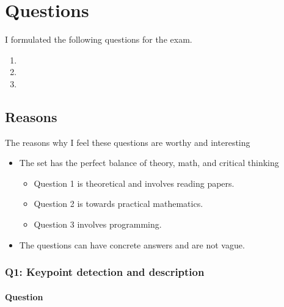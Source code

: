 
\section{Questions}

I formulated the following questions for the exam.

\newcommand{\questionOne}{
    
}

\newcommand{\questionTwo}{
    
}

\newcommand{\questionThree}{
    
}


\begin{enumerate}
    \item \questionOne
    \item \questionTwo
    \item \questionThree
\end{enumerate}

\subsection{Reasons}

The reasons why I feel these questions are worthy and interesting

\begin{itemize}
    \item The set has the perfect balance of theory, math, and critical thinking
    \begin{itemize}
        \item Question 1 is theoretical and involves reading papers.
        \item Question 2 is towards practical mathematics.
        \item Question 3 involves programming.
    \end{itemize}
    \item The questions can have concrete answers and are not vague.
\end{itemize}

\subsubsection*{Q1: Keypoint detection and description}

\paragraph*{Question}
\begin{displayquote}
    \questionOne
\end{displayquote}

